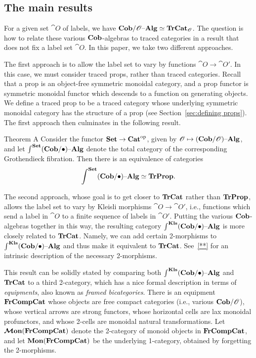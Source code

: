\documentclass[12pt,oneside,article,draft]{memoir}
\begin{document}
\subsection{The main results}

For a given set $\cat{O}$ of labels, we have $\mathbf{Cob}/\mathscr{O}{\text \textendash}\mathbf{Alg}\simeq\mathbf{TrCat}_{\mathscr{O}}$.
The question is how to relate these various $\mathbf{Cob}$-algebras to traced categories in a result that does not fix a label set $\cat{O}$.
In this paper, we take two different approaches.

The first approach is to allow the label set to vary by functions $\cat{O}\to\cat{O'}$.
In this case, we must consider traced props, rather than traced categories.
Recall that a prop is an object-free symmetric monoidal category, and a prop functor is symmetric monoidal functor which descends to a function on generating objects.
We define a traced prop to be a traced category whose underlying symmetric monoidal category has the structure of a prop (see Section~\ref{sec:defining props}).
The first approach then culminates in the following result.

\begin{named}{Theorem A}
	Consider the functor $\mathbf{Set}\to{\mathbf{Cat}}^{\text{op}}$, given by $\mathscr{O}\mapsto(\mathbf{Cob}/\mathscr{O}){\text \textendash}\mathbf{Alg}$, and let $\int^{\mathbf{Set}}(\mathbf{Cob}/\bullet){\text \textendash}\mathbf{Alg}$ denote the total category of the corresponding Grothendieck fibration.
	Then there is an equivalence of categories
	$$\int^{\mathbf{Set}}(\mathbf{Cob}/\bullet){\text \textendash}\mathbf{Alg}\simeq\mathbf{TrProp}.$$
\end{named}

The second approach, whose goal is to get closer to $\mathbf{TrCat}$ rather than $\mathbf{TrProp}$, allows the label set to vary by Kleisli morphisms $\cat{O}\to\cat{O'}$, i.e., functions which send a label in $\cat{O}$ to a finite sequence of labels in $\cat{O'}$.
Putting the various $\mathbf{Cob}$-algebras together in this way, the resulting category $\int^{\mathbf{Kls}}(\mathbf{Cob}/\bullet){\text \textendash}\mathbf{Alg}$ is more closely related to $\mathbf{TrCat}$.
Namely, we can add certain 2-morphisms to $\int^{\mathbf{Kls}}(\mathbf{Cob}/\bullet){\text \textendash}\mathbf{Alg}$ and thus make it equivalent to $\mathbf{TrCat}$.
See~\ref{**} for an intrinsic description of the necessary 2-morphisms.

This result can be solidly stated by comparing both $\int^{\mathbf{Kls}}(\mathbf{Cob}/\bullet){\text \textendash}\mathbf{Alg}$ and $\mathbf{TrCat}$ to a third 2-category, which has a nice formal description in terms of \emph{equipments}, also known as \emph{framed bicategories}.
There is an equipment $\mathbf{FrCompCat}$ whose objects are free compact categories (i.e., various $\mathbf{Cob}/\mathscr{O}$), whose vertical arrows are strong functors, whose horizontal cells are lax monoidal profunctors, and whose 2-cells are monoidal natural transformations.
Let $\bm{\mathcal{M}}\mathbf{on}(\mathbf{FrCompCat})$ denote the 2-category of monoid objects in $\mathbf{FrCompCat}$, and let $\mathbf{Mon}(\mathbf{FrCompCat})$ be the underlying 1-category, obtained by forgetting the 2-morphisms.
\end{document}
